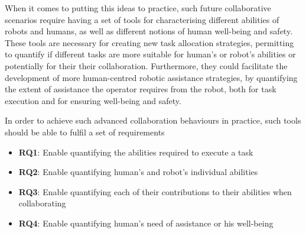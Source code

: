 When it comes to putting this ideas to practice, such future collaborative scenarios require having a set of tools for characterising different abilities of robots and humans, as well as different notions of human well-being and safety. These tools are necessary for creating new task allocation strategies, permitting to quantify if different tasks are more suitable for human's or robot's abilities or potentially for their their collaboration. Furthermore, they could facilitate the development of more human-centred robotic assistance strategies, by quantifying the extent of assistance the operator requires from the robot, both for task execution and for ensuring well-being and safety.

In order to achieve such advanced collaboration behaviours in practice, such tools should be able to fulfil a set of requirements
\begin{itemize}
    \item \textbf{RQ1}: Enable quantifying the abilities required to execute a task
    \item \textbf{RQ2}: Enable quantifying human's and robot's individual abilities
    \item \textbf{RQ3}: Enable quantifying each of their contributions to their abilities when collaborating
    \item \textbf{RQ4}: Enable quantifying human's need of assistance or his well-being
\end{itemize}



